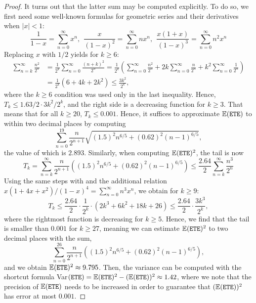 \documentclass{article}
\newcommand{\ETE}{{\tt ETE}}
\begin{document}
\begin{proof}
    It turns out that the latter sum may be computed explicitly.  To do so, we first need some well-known formulas for geometric series and their derivatives when $|x| < 1$:
    \begin{equation}\label{eq:geometric}
        \frac{1}{1 - x} = \sum_{n = 0}^\infty x^n, \ \ \frac{x}{(1-x)^2} = \sum_{n = 0}^\infty nx^n, \ \ \frac{x(1 + x)}{(1-x)^3} = \sum_{n = 0}^\infty n^2 x^n
    \end{equation}
    Replacing $x$ with $1/2$ yields for $k \geq 6$:
    \begin{align*}
    \sum_{n = k}^\infty \frac{n^2}{2^n} &= \frac{1}{2^k}\sum_{n = 0}^\infty \frac{(n + k)^2}{2^n} = \frac{1}{2^k} \left(\sum_{n = 0}^\infty \frac{n^2}{2^n} + 2k \sum_{n = 0}^\infty \frac{n}{2^n} + k^2 \sum_{n = 0}^\infty \frac{1}{2^n}\right)\\
    &= \frac{1}{2^k} \left(6 + 4k + 2k^2 \right) \leq \frac{3k^2}{2^{k}},
    \end{align*}
    where the $k \geq 6$ condition was used only in the last inequality.  Hence, $T_k \leq 1.63/2 \cdot 3k^2/2^{k}$, and the right side is a decreasing function for $k \geq 3$.  That means that for all $k \geq 20$, $T_k \leq 0.001$.  Hence, it suffices to approximate $\mathbb{E}(\ETE)$ to within two decimal places by computing
    \[
    \sum_{n = 0}^{19} \frac{n}{2^{n + 1}}\sqrt{(1.5)^2 n^{6/5} + (0.62)^2 (n - 1)^{6/5}},
    \]
    the value of which is $2.893$.  Similarly, when computing $\mathbb{E}(\ETE)^2$, the tail is now
    \[
    T_k = \sum_{n = k}^\infty \frac{n}{2^{n + 1}} \left((1.5)^2 n^{6/5} + (0.62)^2 (n - 1)^{6/5}\right) \leq \frac{2.64}{2} \sum_{n = k}^\infty \frac{n^3}{2^n}
    \]
    Using the same steps with  and the additional relation $x(1 + 4x + x^2)/(1-x)^4 = \sum_{n = 0}^\infty n^3x^n$, we obtain for $k \geq 9$:
    \[
    T_k \leq \frac{2.64}{2} \cdot \frac{1}{2^k} \cdot\left(2k^3 + 6k^2 + 18k + 26 \right) \leq \frac{2.64}{2} \cdot \frac{3k^3}{2^{k}},
    \]
    where the rightmost function is decreasing for $k \geq 5$.  Hence, we find that the tail is smaller than $0.001$ for $k \geq 27$, meaning we can estimate $\mathbb{E}(\ETE)^2$ to two decimal places with the sum,
    \[
    \sum_{n = 0}^{26} \frac{n}{2^{n + 1}} \left((1.5)^2 n^{6/5} + (0.62)^2 (n - 1)^{6/5}\right),
    \]
    and we obtain $\mathbb{E}(\ETE)^2 \approx 9.795$.  Then, the variance can be computed with the shortcut formula Var$(\ETE) = \mathbb{E}(\ETE)^2 - (\mathbb{E}(\ETE))^2 \approx 1.42$, where we note that the precision of $\mathbb{E}(\ETE)$ needs to be increased in order to guarantee that $(\mathbb{E}(\ETE))^2$ has error at most $0.001$.
    
\end{proof}
\end{document}
